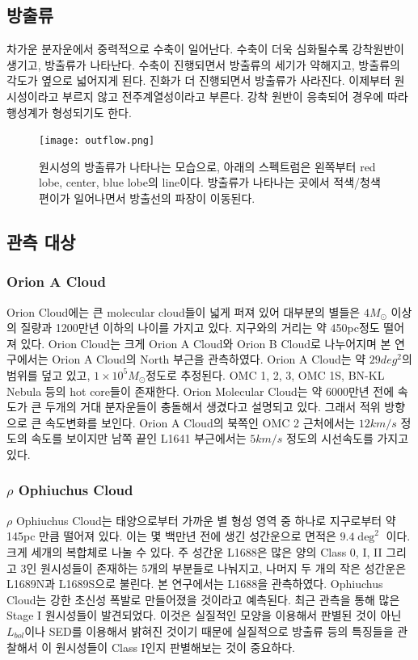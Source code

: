 \subsection{방출류}
차가운 분자운에서 중력적으로 수축이 일어난다. 수축이 더욱 심화될수록 강착원반이 생기고, 방출류가 나타난다. 수축이 진행되면서 방출류의 세기가 약해지고, 방출류의 각도가 옆으로 넓어지게 된다. 진화가 더 진행되면서 방출류가 사라진다. 이제부터 원시성이라고 부르지 않고 전주계열성이라고 부른다. 강착 원반이 응축되어 경우에 따라 행성계가 형성되기도 한다. 
\begin{figure}[h]
	\centering
	\texttt{[image: outflow.png]}
	\caption{원시성의 방출류가 나타나는 모습으로, 아래의 스펙트럼은 왼쪽부터 red lobe, center, blue lobe의 line이다. 방출류가 나타나는 곳에서 적색/청색편이가 일어나면서 방출선의 파장이 이동된다.}
\end{figure}


\subsection{관측 대상}
\subsubsection{Orion A Cloud}

Orion Cloud에는 큰 molecular cloud들이 넓게 퍼져 있어 대부분의 별들은 $4M_{\odot}$ 이상의 질량과 1200만년 이하의 나이를 가지고 있다. 지구와의 거리는 약 450pc정도 떨어져 있다.\cite{Oriondistance} Orion Cloud는 크게 Orion A Cloud와 Orion B Cloud로 나누어지며 본 연구에서는 Orion A Cloud의 North 부근을 관측하였다. Orion A Cloud는 약 $29deg^2$의 범위를 덮고 있고, $1 \times 10^5 M_{\odot}$정도로 추정된다. OMC 1, 2, 3, OMC 1S, BN-KL Nebula 등의 hot core들이 존재한다.
Orion Molecular Cloud는 약 6000만년 전에 속도가 큰 두개의 거대 분자운들이 충돌해서 생겼다고 설명되고 있다. 그래서 적위 방향으로 큰 속도변화를 보인다. Orion A Cloud의 북쪽인 OMC 2 근처에서는 $12km/s$ 정도의 속도를 보이지만 남쪽 끝인 L1641 부근에서는 $5km/s$ 정도의 시선속도를 가지고 있다. \cite{Schulz}


\subsubsection{$\rho$ Ophiuchus Cloud}
$\rho$ Ophiuchus Cloud는 태양으로부터 가까운 별 형성 영역 중 하나로 지구로부터 약 145pc 만큼 떨어져 있다. 이는 몇 백만년 전에 생긴 성간운으로 면적은 $9.4 \deg^2$ 이다. 크게 세개의 복합체로 나눌 수 있다. 주 성간운 L1688은 많은 양의 Class 0, I, II 그리고 3인 원시성들이 존재하는 5개의 부분들로 나눠지고, 나머지 두 개의 작은 성간운은 L1689N과 L1689S으로 불린다. 본 연구에서는 L1688을 관측하였다. Ophiuchus Cloud는 강한 초신성 폭발로 만들어졌을 것이라고 예측된다. 최근 관측을 통해 많은 Stage I 원시성들이 발견되었다. 이것은 실질적인 모양을 이용해서 판별된 것이 아닌 $L_{bol}$이나 SED를 이용해서 밝혀진 것이기 때문에 실질적으로 방출류 등의 특징들을 관찰해서 이 원시성들이 Class I인지 판별해보는 것이 중요하다.\cite{Schulz}




